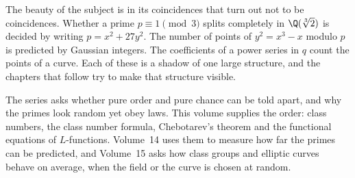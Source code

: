 The beauty of the subject is in its coincidences that turn out not to be coincidences. Whether a prime $p\equiv1\pmod 3$ splits completely in
$\Q(\sqrt[3]2)$ is decided by writing $p=x^2+27y^2$. The number of points of $y^2=x^3-x$ modulo $p$ is predicted by
Gaussian integers. The coefficients of a power series in $q$ count the points of a curve. Each of these is a shadow of
one large structure, and the chapters that follow try to make that structure visible.

The series asks whether pure order and pure chance can be told apart, and why the primes look random yet obey laws.
This volume supplies the order: class numbers, the class number formula, Chebotarev's theorem and the functional
equations of $L$-functions. Volume~14 uses them to measure how far the primes can be predicted, and Volume~15 asks how
class groups and elliptic curves behave on average, when the field or the curve is chosen at random.
